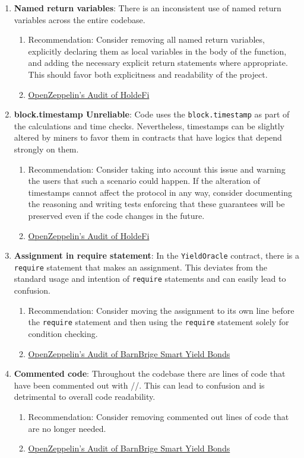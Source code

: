 \begin{enumerate}
\item\textbf{Named return variables}: There is an inconsistent use of named return variables across the entire codebase.
	\begin{enumerate}
	\item Recommendation: Consider removing all named return variables, explicitly declaring them as local variables in the body of the function, and adding the necessary explicit return statements where appropriate. This should favor both explicitness and readability of the project.
	\item\href{https://blog.openzeppelin.com/holdefi-audit}{OpenZeppelin's Audit of HoldeFi}
	\end{enumerate}

\item\textbf{block.timestamp Unreliable}: Code uses the \verb|block.timestamp| as part of the calculations and time checks. Nevertheless, timestamps can be slightly altered by miners to favor them in contracts that have logics that depend strongly on them.
	\begin{enumerate}
	\item Recommendation: Consider taking into account this issue and warning the users that such a scenario could happen. If the alteration of timestamps cannot affect the protocol in any way, consider documenting the reasoning and writing tests enforcing that these guarantees will be preserved even if the code changes in the future.
	\item\href{https://blog.openzeppelin.com/holdefi-audit}{OpenZeppelin's Audit of HoldeFi}
	\end{enumerate}

\item\textbf{Assignment in require statement}: In the \verb|YieldOracle| contract, there is a \verb|require| statement that makes an assignment. This deviates from the standard usage and intention of \verb|require| statements and can easily lead to confusion.
	\begin{enumerate}
	\item Recommendation: Consider moving the assignment to its own line before the \verb|require| statement and then using the \verb|require| statement solely for condition checking.
	\item\href{https://blog.openzeppelin.com/barnbridge-smart-yield-bonds-audit/}{OpenZeppelin's Audit of BarnBrige Smart Yield Bonds}
	\end{enumerate}

\item\textbf{Commented code}: Throughout the codebase there are lines of code that have been commented out with //. This can lead to confusion and is detrimental to overall code readability.
	\begin{enumerate}
	\item Recommendation: Consider removing commented out lines of code that are no longer needed.
	\item\href{https://blog.openzeppelin.com/barnbridge-smart-yield-bonds-audit/}{OpenZeppelin's Audit of BarnBrige Smart Yield Bonds}
	\end{enumerate}


\end{enumerate}
